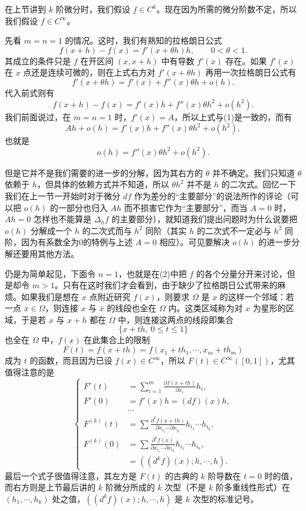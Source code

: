 在上节讲到 $k$ 阶微分时，我们假设 $f\in C^k$。现在因为所需的微分阶数不定，所以我们假设 $f\in C^\infty$。

先看 $m=n=1$ 的情况。这时，我们有熟知的拉格朗日公式
\[
 f(x+h)-f(x)=f'(x+\theta h)h,\qquad 0<\theta<1.
\]
其成立的条件只是 $f$ 在开区间 $(x,x+h)$ 中有导数 $f'(x)$ 存在。如果 $f'(x)$ 在 $x$ 点还是连续可微的，则在上式右方对 $f'(x+\theta h)$ 再用一次拉格朗日公式有
\[
 f'(x+\theta h)=f'(x)+f''(x)\theta h+o(h).
\]
代入前式则有
\[
 f(x+h)-f(x)=f'(x)h+f''(x)\theta h^2+o(h^2).
\]
我们前面说过，在 $m=n=1$ 时，$f'(x)=A$，所以上式与(1)是一致的，而有
\[
 Ah+o(h)=f'(x)h+f''(x)\theta h^2+o(h^2),
\]
也就是
\[
 o(h)=f''(x)\theta h^2+o(h^2).
\]

但是它并不是我们需要的进一步的分解，因为其右方的 $\theta$ 并不确定。我们只知道 $\theta$ 依赖于 $h$，但具体的依赖方式并不知道，所以 $\theta h^2$ 并不是 $h$ 的二次式。回忆一下我们在上一节一开始时对于微分 $df$ 作为差分的“主要部分”的说法所作的评论（可以把 $o(h)$ 的一部分也归入 $Ah$ 而不损害它作为“主要部分”，而当 $A=0$ 时，$Ah=0$ 怎样也不能算是 $\Delta_hf$ 的主要部分），就知道我们提出问题时为什么说要把 $o(h)$ 分解成一个 $h$ 的二次式而与 $h^2$ 同阶（其实 $h$ 的二次式不一定必与 $h^2$ 同阶，因为有系数全为0的特例与上述 $A=0$ 相应）。可见要解决 $o(h)$ 的进一步分解还要用其他方法。

仍是为简单起见，下面令 $n=1$，也就是在(2)中把 $f$ 的各个分量分开来讨论，但是却令 $m>1$。只有在这时我们才会看到，由于缺少了拉格朗日公式带来的麻烦。如果我们是想在 $x$ 点附近研究 $f(x)$，则要求 $\Omega$ 是 $x$ 的这样一个邻域：若一点 $\bar x\in\Omega$，则连接 $x$ 与 $\bar x$ 的线段也全在 $\Omega$ 内。这类区域称为对 $x$ 为星形的区域，于是若 $x$ 与 $x+h$ 都在 $\Omega$ 中，则连接这两点的线段即集合
\begin{equation}
 \{x+th,\ 0\le t\le1\}
 \tag{4}
\end{equation}
也全在 $\Omega$ 中，$f(x)$ 在此集合上的限制
\[
 F(t)=f(x+th)=f(x_1+th_1,\cdots,x_m+th_m)
\]
成为 $t$ 的函数，而且因为已设 $f(x)\in C^\infty$，所以 $F(t)\in C^\infty([0,1])$，尤其值得注意的是
\begin{equation}
\left\{
\begin{aligned}
 F'(t)&=\sum_{i=1}^m\frac{\partial f(x+th)}{\partial x_i}h_i,\\
 F'(0)&=f'(x)h=(df)(x)h,\\[1mm]
 &\cdots\\[-1mm]
 F^{(k)}(t)&=\sum\frac{\partial^k f(x+th)}{\partial x_{i_1}\cdots\partial x_{i_k}}
              h_{i_1}\cdots h_{i_k},\\
 F^{(k)}(0)&=\sum\frac{\partial^k f(x)}{\partial x_{i_1}\cdots\partial x_{i_k}}
              h_{i_1}\cdots h_{i_k},\\
 &=((d^kf)(x);h,\cdots,h).
\end{aligned}
\right.
\tag{5}
\end{equation}
最后一个式子很值得注意，其左方是 $F(t)$ 的古典的 $k$ 阶导数在 $t=0$ 时的值，而右方则是上节最后讲的 $k$ 阶微分所成的 $k$ 次型（不是 $k$ 阶多重线性形式）在 $(h_1,\cdots,h_k)$ 处之值，$((d^kf)(x);h,\cdots,h)$ 是 $k$ 次型的标准记号。

